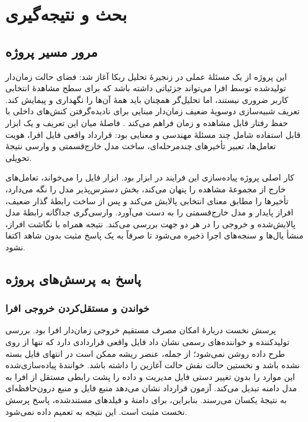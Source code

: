 
\chapter{بحث و نتیجه‌گیری}
\label{chap:conclusion}

\section{مرور مسیر پروژه}

این پروژه از یک مسئلهٔ عملی در زنجیرهٔ تحلیل ربکا آغاز شد: فضای حالت زمان‌دار تولیدشده توسط افرا می‌تواند جزئیاتی داشته باشد که برای سطح مشاهدهٔ انتخابی کاربر ضروری نیستند، اما تحلیل‌گر همچنان باید همهٔ آن‌ها را نگهداری و پیمایش کند. تعریف شبیه‌سازی دوسویهٔ ضعیف زمان‌دار مبنایی برای نادیده‌گرفتن کنش‌های داخلی با حفظ رفتار قابل مشاهده و زمان فراهم می‌کند \cite{ReynierSangnier2009,LiebEtAl2025}. فاصلهٔ میان این تعریف و یک ابزار قابل استفاده شامل چند مسئلهٔ مهندسی و معنایی بود: قرارداد واقعی فایل افرا، هویت تعامل‌ها، تعبیر تأخیرهای چندمرحله‌ای، ساخت مدل خارج‌قسمتی و وارسی نتیجهٔ تحویلی.

کار اصلی پروژه پیاده‌سازی این فرایند در ابزار  بود. ابزار فایل  را می‌خواند، تعامل‌های خارج از مجموعهٔ مشاهده را پنهان می‌کند، بخش دسترس‌پذیر مدل را نگه می‌دارد، تأخیرها را مطابق معنای انتخابی پالایش می‌کند و پس از ساخت رابطهٔ گذار ضعیف، افراز پایدار و مدل خارج‌قسمتی را به دست می‌آورد. وارسی‌گری جداگانه رابطهٔ مدل پالایش‌شده و خروجی را در هر دو جهت بررسی می‌کند. نتیجه همراه با نگاشت افراز، منشأ یال‌ها و سنجه‌های اجرا ذخیره می‌شود تا صرفاً به یک پاسخ مثبت بدون شاهد اکتفا نشود.

\section{پاسخ به پرسش‌های پروژه}

\subsection{خواندن و مستقل‌کردن خروجی افرا}

پرسش نخست دربارهٔ امکان مصرف مستقیم خروجی زمان‌دار افرا بود. بررسی تولیدکننده و خواننده‌های رسمی نشان داد فایل واقعی  قراردادی دارد که تنها از روی طرح داده روشن نمی‌شود؛ از جمله، عنصر ریشه ممکن است در انتهای فایل بسته نشده باشد و نخستین حالت نقش حالت آغازین را داشته باشد. خوانندهٔ پیاده‌سازی‌شده این موارد را بدون تغییر دستی فایل مدیریت و داده را پشت رابطی مستقل از افرا به مدل دامنه تبدیل می‌کند. آزمون قرارداد نشان می‌دهد منبع فایل و منبع درون‌حافظه‌ای به نتیجهٔ یکسان می‌رسند. بنابراین، برای دامنهٔ  و فیلدهای مستندشده، پاسخ پرسش نخست مثبت است. این نتیجه به  تعمیم داده نمی‌شود.

